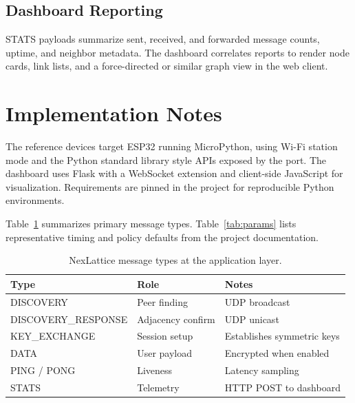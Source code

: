 \documentclass[conference]{IEEEtran}
\begin{document}
\subsection{Dashboard Reporting}
STATS payloads summarize sent, received, and forwarded message counts, uptime, and neighbor metadata. The dashboard correlates reports to render node cards, link lists, and a force-directed or similar graph view in the web client.

\section{Implementation Notes}
The reference devices target ESP32 \cite{esp32} running MicroPython, using Wi-Fi station mode and the Python standard library style APIs exposed by the port. The dashboard uses Flask with a WebSocket extension and client-side JavaScript for visualization. Requirements are pinned in the project for reproducible Python environments.

Table~\ref{tab:messages} summarizes primary message types. Table~\ref{tab:params} lists representative timing and policy defaults from the project documentation.

\begin{table}[htbp]
\caption{NexLattice message types at the application layer.}
\label{tab:messages}
\begin{center}
\begin{tabular}{l l p{4.2cm}}
\hline
\textbf{Type} & \textbf{Role} & \textbf{Notes} \\
\hline
DISCOVERY & Peer finding & UDP broadcast \\
DISCOVERY\_RESPONSE & Adjacency confirm & UDP unicast \\
KEY\_EXCHANGE & Session setup & Establishes symmetric keys \\
DATA & User payload & Encrypted when enabled \\
PING / PONG & Liveness & Latency sampling \\
STATS & Telemetry & HTTP POST to dashboard \\
\hline
\end{tabular}
\end{center}
\end{table}
\end{document}
